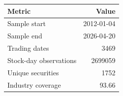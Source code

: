 \begin{tabular}{lr}
\toprule
Metric & Value \\
\midrule
Sample start & 2012-01-04 \\
Sample end & 2026-04-20 \\
Trading dates & 3469 \\
Stock-day observations & 2699059 \\
Unique securities & 1752 \\
Industry coverage & 93.66\\%
\bottomrule
\end{tabular}
